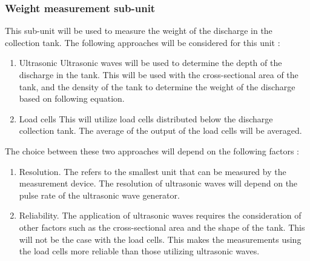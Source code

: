 \subsubsection{Weight measurement sub-unit}
This sub-unit will be used to measure the weight of the discharge in the collection tank. The following approaches will be considered for this unit :

\begin{enumerate}
    \item Ultrasonic \newline
    Ultrasonic waves will be used to determine the depth of the discharge in the tank. This will be used with the cross-sectional area of the tank, and the density of the tank to determine the weight of the discharge based on following equation.
    \item Load cells \newline
    This will utilize load cells distributed below the discharge collection tank. The average of the output of the load cells will be averaged. 
\end{enumerate}

\par
The choice between these two approaches will depend on the following factors :
\begin{enumerate}
    \item Resolution. \newline
    The refers to the smallest unit that can be measured by the measurement device. The resolution of ultrasonic waves will depend on the pulse rate of the ultrasonic wave generator. 
    \item Reliability. \newline
    The application of ultrasonic waves requires the consideration of other factors such as the cross-sectional area and the shape of the tank. This will not be the case with the load cells. This makes the measurements using the load cells more reliable than those utilizing ultrasonic waves.
\end{enumerate}

